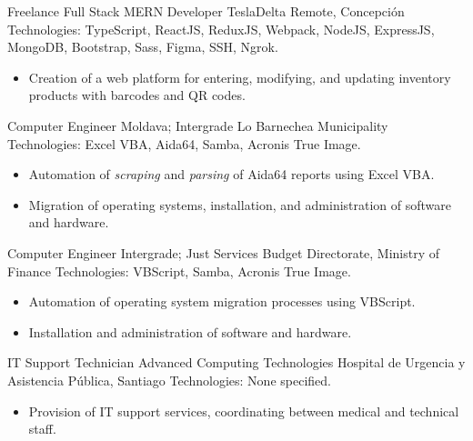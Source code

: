 \documentclass[12pt,letterpaper,sans]{moderncv}
\begin{document}
{Freelance Full Stack MERN Developer}
{TeslaDelta}
{\newline Remote, Concepción}
{\newline Technologies: TypeScript, ReactJS, ReduxJS, Webpack, NodeJS, ExpressJS, MongoDB, Bootstrap, Sass, Figma, SSH, Ngrok.}
{
  \begin{itemize}
    \item Creation of a web platform for entering, modifying, and updating inventory products with barcodes and QR codes.
  \end{itemize}
}
\vspace{0.5em}

{Computer Engineer}
{Moldava; Intergrade}
{\newline Lo Barnechea Municipality}
{\newline Technologies: Excel VBA, Aida64, Samba, Acronis True Image.}
{
  \begin{itemize}
    \item Automation of \textit{scraping} and \textit{parsing} of Aida64 reports using Excel VBA.
    \item Migration of operating systems, installation, and administration of software and hardware.
  \end{itemize}
}
\vspace{0.5em}

{Computer Engineer}
{Intergrade; Just Services}
{\newline Budget Directorate, Ministry of Finance}
{\newline Technologies: VBScript, Samba, Acronis True Image.}
{
  \begin{itemize}
    \item Automation of operating system migration processes using VBScript.
    \item Installation and administration of software and hardware.
  \end{itemize}
}
\vspace{0.5em}

{IT Support Technician}
{Advanced Computing Technologies}
{\newline Hospital de Urgencia y Asistencia Pública, Santiago}
{\newline Technologies: None specified.}
{
  \begin{itemize}
    \item Provision of IT support services, coordinating between medical and technical staff.
  \end{itemize}
}
\vspace{0.5em}
\end{document}
